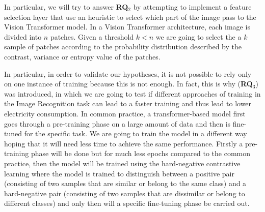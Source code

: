 In particular, we will try to answer \textbf{RQ$_{2}$} by attempting to implement a feature selection layer that use an heuristic to select which part of the image pass to the Vision Transformer model. In a Vision Transformer architecture, each image is divided into $n$ patches. Given a threshold $k < n$ we are going to select the a $k$ sample of patches according to the probability distribution described by the contrast, variance or entropy value of the patches.

In particular, in order to validate our hypotheses, it is not possible to rely only on one instance of training because this is not enough. In fact, this is why (\textbf{RQ$_{3}$}) was introduced, in which we are going to test if different approaches of training in the Image Recognition task can lead to a faster training and thus lead to lower electricity consumption. In common practice, a transformer-based model first goes through a pre-training phase on a large amount of data and then is fine-tuned for the specific task. We are going to train the model in a different way hoping that it will need less time to achieve the same performance. Firstly a pre-training phase will be done but for much less epochs compared to the common practice, then the model will be trained using the hard-negative contrastive learning where the model is trained to distinguish between a positive pair (consisting of two samples that are similar or belong to the same class) and a hard-negative pair  (consisting of two samples that are dissimilar or belong to different classes) and only then will a specific fine-tuning phase be carried out.